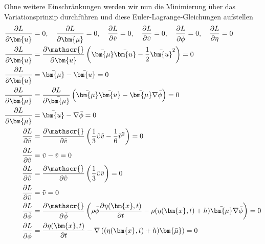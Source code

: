 Ohne weitere Einschränkungen werden wir nun die Minimierung über das Variationsprinzip durchführen und diese Euler-Lagrange-Gleichungen aufstellen
\begin{align}
\frac{\partial L}{\partial \bar{\bm{u}}} &= 0
,\quad
\frac{\partial L}{\partial \bar{\bm{\mu}}} = 0
,\quad
\frac{\partial L}{\partial \tilde{v}} = 0
,\quad
\frac{\partial L}{\partial \tilde{\upsilon}} = 0
,\quad
\frac{\partial L}{\partial \bar{\phi}} = 0
,\quad
\frac{\partial L}{\partial \eta} = 0
\notag
\\
	\frac{\partial L}{\partial \bar{\bm{u}}}
	&=
	\frac{\partial \mathscr{}}{\partial \bar{\bm{u}}}\left(\bar{\bm{\mu}}\bar{\bm{u}} - \frac{1}{2} \bar{\bm{u}}^2\right)
	= 0
	\nonumber \\ 
	\frac{\partial L}{\partial \bar{\bm{u}}}
	&=
	\bar{\bm{\mu}} - \bar{\bm{u}}
	= 0
	\label{luke:Variation_nach_u} 
	\\
	\frac{\partial L}{\partial \bar{\bm{\mu}}}
	&=
	\frac{\partial L}{\partial \bar{\bm{\mu}}} \left( \bar{\bm{\mu}}\bar{\bm{u}}-\bar{\bm{\mu}}\nabla \bar{\phi} \right)
	= 0
	\nonumber \\
	\frac{\partial L}{\partial \bar{\bm{\mu}}}
	&=
	\bar{\bm{u}}-\nabla \bar{\phi}
	= 0
	\label{luke:Variation_nach_mu}
	\\
	\frac{\partial L}{\partial \tilde{v}}
	&=
	\frac{\partial \mathscr{}}{\partial \tilde{v}}\left(\frac{1}{3} \tilde{\upsilon}\tilde{v} - \frac{1}{6} \tilde{v}^2\right)
	= 0
	\nonumber \\
	\frac{\partial L}{\partial \tilde{v}}
	&=
	\tilde{\upsilon}-\tilde{v}
	= 0
	\label{luke:Variation_nach_v}
	\\
	\frac{\partial L}{\partial \tilde{\upsilon}}
	&=
	\frac{\partial \mathscr{}}{\partial \tilde{\upsilon}}\left(\frac{1}{3} \tilde{\upsilon}\tilde{v}\right)
	= 0
	\nonumber \\	
	\frac{\partial L}{\partial \tilde{\upsilon}}
	&=
	\tilde{v}
	= 0
	\label{luke:Variation_nach_upsilon}
	\\
	\frac{\partial L}{\partial \bar{\phi}}
	&=
	\frac{\partial \mathscr{}}{\partial \bar{\phi}}\left(
	\rho\bar{\phi}\frac{\partial \eta(\bm{x}, t)}{\partial t}
	-
	\rho(\eta(\bm{x}, t) + h)\bar{\bm{\mu}}\nabla \bar{\phi}
	\right)
	= 0
	\nonumber \\
	\frac{\partial L}{\partial \bar{\phi}}
	&=
	\frac{\partial \eta(\bm{x}, t)}{\partial t} -  \nabla\left((\eta(\bm{x}, t)+ h)\bm{\bar{\mu}}\right)
	= 0
	\label{luke:Variation_nach_phi}

\end{align}
